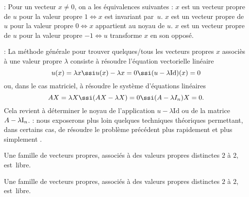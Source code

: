 \Remarque : Pour un vecteur $x\neq0$, on a les \'equivalences suivantes : \pn
$x$ est un vecteur propre de $u$ pour la valeur propre $1\Longleftrightarrow x$ est invariant par~$u$. \pn
$x$ est un vecteur propre de $u$ pour la valeur propre $0\Longleftrightarrow x$ appartient au noyau de $u$. \pn
$x$ est un vecteur propre de $u$ pour la valeur propre $-1\Longleftrightarrow u$ transforme $x$ en son oppos\'e. 
\bigskip

\Remarque : La m\'ethode g\'en\'erale pour trouver quelques/tous les vecteurs propres $x$ associ\`es \`a une valeur propre $\lambda$ 
consiste \`a r\'esoudre l'\'equation vectorielle lin\'eaire 
$$
u(x)=\lambda x \ssi u(x)-\lambda x=0 \ssi (u-\lambda\mbox{Id})(x)=0
$$
ou, dans le cas matriciel, \`a r\'esoudre le syst\`eme d'\'equations lin\'eaires 
$$
AX=\lambda X\ssi (AX-\lambda X)=0\ssi (A-\lambda I_n)X=0. 
$$
Cela revient \`a d\'eterminer le noyau de l'application $u-\lambda \mbox{Id}$ ou de la matrice $A-\lambda\mbox I_n$. 
\bigskip
\Remarque : nous exposerons plus loin quelques techniques th\'eoriques permettant, dans certains cas, 
de r\'esoudre le probl\`eme pr\'ec\'edent plus rapidement et plus simplement . 
\bigskip


\Propriete [$E$ $\ob K$-EV, $u\in\sc L(E)$] 
Une famille de vecteurs propres, associ\'es \`a des valeurs propres distinctes $2$ \`a $2$, est~libre. 

\Invertedtrue
\Propriete [$n\ge1$, $A\in\sc M_n(\ob K)$]
Une famille de vecteurs propres, associ\'es \`a des valeurs propres distinctes $2$ \`a $2$, est~libre. 



